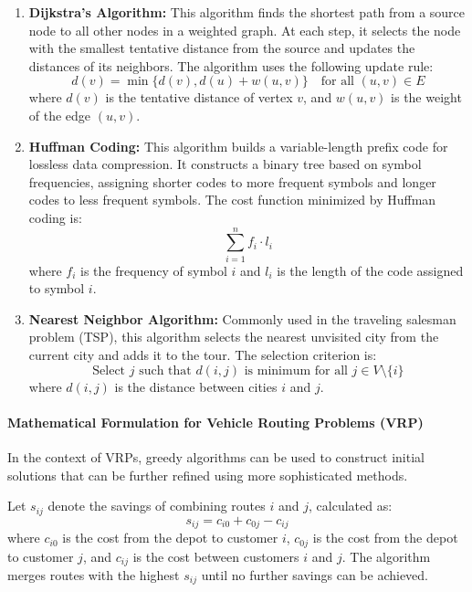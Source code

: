 \documentclass{article}
\begin{document}
    \begin{enumerate}
        \item \textbf{Dijkstra’s Algorithm:} This algorithm finds the shortest path from a source node to all other nodes in a weighted graph. At each step, it selects the node with the smallest tentative distance from the source and updates the distances of its neighbors. The algorithm uses the following update rule:
        \[
            d(v) = \min \{ d(v), d(u) + w(u, v) \} \quad \text{for all } (u, v) \in E
        \]
        where \(d(v)\) is the tentative distance of vertex \(v\), and \(w(u, v)\) is the weight of the edge \((u, v)\). \cite{brilliant_dijkstra}

        \item \textbf{Huffman Coding:} This algorithm builds a variable-length prefix code for lossless data compression. It constructs a binary tree based on symbol frequencies, assigning shorter codes to more frequent symbols and longer codes to less frequent symbols. The cost function minimized by Huffman coding is:
        \[
            \sum_{i=1}^n f_i \cdot l_i
        \]
        where \(f_i\) is the frequency of symbol \(i\) and \(l_i\) is the length of the code assigned to symbol \(i\). \cite{walkccc2024}

        \item \textbf{Nearest Neighbor Algorithm:} Commonly used in the traveling salesman problem (TSP), this algorithm selects the nearest unvisited city from the current city and adds it to the tour. The selection criterion is:
        \[
            \text{Select } j \text{ such that } d(i, j) \text{ is minimum for all } j \in V \setminus \{i\}
        \]
        where \(d(i, j)\) is the distance between cities \(i\) and \(j\). \cite{richar2012}
    \end{enumerate}

    \paragraph{Mathematical Formulation for Vehicle Routing Problems (VRP)}

    In the context of VRPs, greedy algorithms can be used to construct initial solutions that can be further refined using more sophisticated methods.

    Let \(s_{ij}\) denote the savings of combining routes \(i\) and \(j\), calculated as:
    \[
        s_{ij} = c_{i0} + c_{0j} - c_{ij}
    \]
    where \(c_{i0}\) is the cost from the depot to customer \(i\), \(c_{0j}\) is the cost from the depot to customer \(j\), and \(c_{ij}\) is the cost between customers \(i\) and \(j\). The algorithm merges routes with the highest \(s_{ij}\) until no further savings can be achieved. \cite[pp. 3-5, 62-65]{toth2014vehicle}
\end{document}
